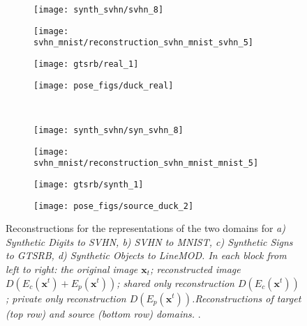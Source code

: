 \documentclass{article}
\newcommand{\bs}[1]{\boldsymbol{\mathbf{#1}}}
\begin{document}
\begin{figure}[ht]
    \begin{subfigure}[b]{\subfigscale\linewidth}
        \centering
        \texttt{[image: synth\_svhn/svhn\_8]}
    \end{subfigure}
    \begin{subfigure}[b]{\subfigscale\linewidth}
        \centering
        \texttt{[image: svhn\_mnist/reconstruction\_svhn\_mnist\_svhn\_5]}
    \end{subfigure}
    \begin{subfigure}[b]{\subfigscale\linewidth}
        \centering
        \texttt{[image: gtsrb/real\_1]}
    \end{subfigure}
    \begin{subfigure}[b]{\subfigscale\linewidth}
        \centering
        \texttt{[image: pose\_figs/duck\_real]}
    \end{subfigure} \\
    \begin{subfigure}[b]{\subfigscale\linewidth}
        \centering
        \texttt{[image: synth\_svhn/syn\_svhn\_8]}
        \caption{}
    \end{subfigure}
    \begin{subfigure}[b]{\subfigscale\linewidth}
        \centering
        \texttt{[image: svhn\_mnist/reconstruction\_svhn\_mnist\_mnist\_5]}
        \caption{}
    \end{subfigure}
    \begin{subfigure}[b]{\subfigscale\linewidth}
        \centering
        \texttt{[image: gtsrb/synth\_1]}
        \caption{}
    \end{subfigure}
    \begin{subfigure}[b]{\subfigscale\linewidth}
        \centering
        \texttt{[image: pose\_figs/source\_duck\_2]}
        \caption{}
    \end{subfigure}
    \caption{
    Reconstructions for the representations of the two domains for \textit{a) Synthetic Digits to SVHN, \textit{b)} SVHN to MNIST, \textit{c)} Synthetic Signs to GTSRB, \textit{d)} Synthetic Objects to LineMOD. In each block from left to right: the original image $\bs x_t$; reconstructed image $D({E_c(\bs x^t) + E_p(\bs x^t)}) $; shared only reconstruction  $D(E_c(\bs x^t)) $;  private only reconstruction  $D(E_p(\bs x^t))$.Reconstructions of target \textit{(top row)} and source \textit{(bottom row)} domains. }.
    }
    \label{fig:sdads}
\end{figure}
\end{document}
